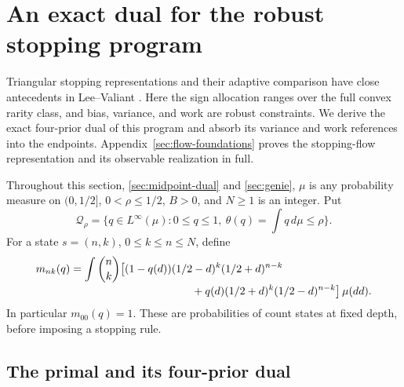 \section{An exact dual for the robust stopping program}
\label{sec:exact-dual}

Triangular stopping representations and their adaptive comparison have
close antecedents in Lee--Valiant \cite{leevaliant}. Here the sign allocation
ranges over the full convex rarity class, and bias, variance, and work
are robust constraints. We derive the exact four-prior dual of this
program and absorb its variance and work references into the endpoints.
Appendix~\ref{sec:flow-foundations} proves the stopping-flow representation
and its observable realization in full.

Throughout this section, \cref{sec:midpoint-dual} and \cref{sec:genie},
$\mu$ is any probability measure on $(0,1/2]$,
$0<\rho\le1/2$, $B>0$, and $N\ge1$ is an integer. Put
\[
 \mathcal Q_\rho=\{q\in L^\infty(\mu):0\le q\le1,\
                \theta(q)=\textstyle\int q\,d\mu\le\rho\}.
\]
For a state $s=(n,k)$, $0\le k\le n\le N$, define
\begin{align}
 m_{nk}(q)&=\int\binom nk\bigl[
 (1-q(d))(1/2-d)^k(1/2+d)^{n-k}\notag\\[-2pt]
 &\hspace{39mm}+q(d)(1/2+d)^k(1/2-d)^{n-k}\bigr]\,\mu(dd).
 \label{eq:dual-count-coefficients}
\end{align}
In particular $m_{00}(q)=1$. These are probabilities of count states at
fixed depth, before imposing a stopping rule.

\subsection{The primal and its four-prior dual}

